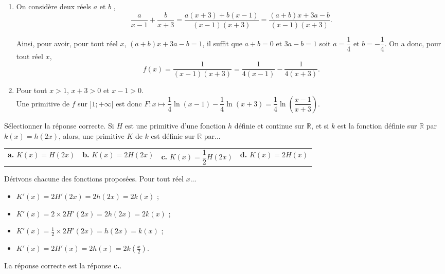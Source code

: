 \documentclass[11pt,fleqn, openany]{book} %
\begin{document}
\begin{solution} \hspace{0pt}

\begin{enumerate}\item  On considère deux réels \(a\) et \(b\) ,
\[\dfrac{a}{x-1}+\dfrac{b}{x+3}=\dfrac{a(x+3)+b(x-1)}{(x-1)(x+3)}=\dfrac{(a+b)x+3a-b}{(x-1)(x+3)}.\]

Ainsi, pour avoir, pour tout réel \(x\), \((a+b)x+3a-b=1\), il suffit que \(a+b=0\) et \(3a-b=1\) soit \(a=\dfrac{1}{4}\) et \(b=-\dfrac{1}{4}\). On a donc, pour tout réel \(x\), 
\[f(x)=\dfrac{1}{(x-1)(x+3)}=\dfrac{1}{4(x-1)}-\dfrac{1}{4(x+3)}.\]

\item  Pour tout \(x>1\), \(x+3>0\) et \(x-1>0\). \\

Une primitive de \(f\) sur \(]1;+\infty[\) est donc \(F:x\mapsto \dfrac{1}{4}\ln(x-1)-\dfrac{1}{4}\ln(x+3)=\dfrac{1}{4}\ln\left(\dfrac{x-1}{x+3}\right)\).\end{enumerate}
\end{solution}



\begin{exercise}[subtitle={(Polynésie 2022)}]Sélectionner la réponse correcte. Si $H$ est une primitive d'une fonction $h$ définie et continue sur $\mathbb{R}$, et si $k$ est la fonction définie sur $\mathbb{R}$ par $k(x)=h(2x)$, alors, une primitive $K$ de $k$ est définie sur $\mathbb{R}$ par...

\begin{tabularx}{\linewidth}{XXXX}
\textbf{a.} $K(x)=H(2x)$ & \textbf{b.} $K(x)=2H(2x)$ & \textbf{c.} $K(x)=\dfrac{1}{2}H(2x)$ & \textbf{d.} $K(x)=2H(x)$\end{tabularx}\vspace{-0.5cm}\end{exercise}



\begin{solution}
Dérivons chacune des fonctions proposées. Pour tout réel $x$...
\begin{itemize}
\item $K'(x)=2H'(2x)=2h(2x)=2k(x)$ ;
\item $K'(x)=2 \times 2H'(2x)=2h(2x)=2k(x)$ ;
\item $K'(x)=\frac{1}{2} \times 2H'(2x)=h(2x)=k(x)$ ;
\item $K'(x)=2H'(x)=2h(x)=2k\left(\frac{x}{2}\right)$.\end{itemize}
La réponse correcte est la réponse\textbf{ c.}.\end{solution}
\end{document}
